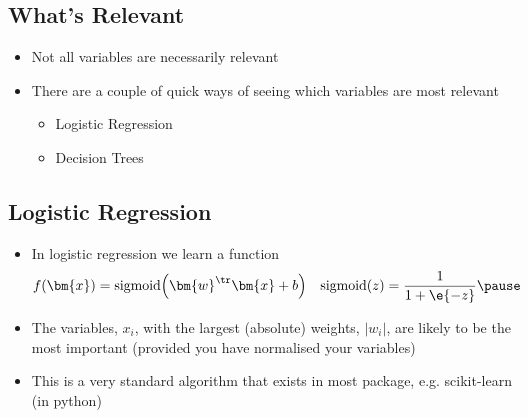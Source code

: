 \Outline %

\begin{slide}
\section{What's Relevant}

\begin{PauseHighLight}
  \begin{itemize}
  \item Not all variables are necessarily relevant\pause
  \item There are a couple of quick ways of seeing which variables are
    most relevant
    \begin{itemize}
    \item Logistic Regression
    \item Decision Trees\pause
    \end{itemize}
  \end{itemize}
\end{PauseHighLight}

\end{slide}


\begin{slide}
\section{Logistic Regression}

\begin{PauseHighLight}
  \begin{itemize}
  \item In logistic regression we learn a function
    \begin{align*}
      f(\bm{x}) &= \mathrm{sigmoid}\!\left(\bm{w}^\tr\bm{x} +b\right)
      &
      \mathrm{sigmoid}(z) &= \frac{1}{1 + \e{-z}}  \pause
    \end{align*}
  \item The variables, $x_i$, with the largest (absolute) weights,
    $|w_i|$, are likely to be the most important\pause{} (provided you
    have normalised your variables)\pauseb
  \item This is a very standard algorithm that exists in most package,
    e.g.{} scikit-learn (in python)\pause
  \end{itemize}
\end{PauseHighLight}

\end{slide}

